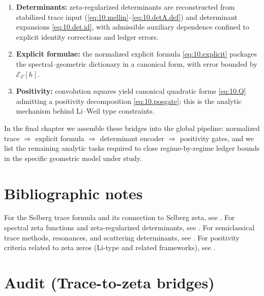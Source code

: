\begin{enumerate}
\item \textbf{Determinants:} zeta-regularized determinants are reconstructed from stabilized trace input
(\eqref{eq:10.mellin}--\eqref{eq:10.detA.def}) and determinant expansions \eqref{eq:10.det.id}, with admissible auxiliary dependence
confined to explicit identity corrections and ledger errors.
\item \textbf{Explicit formulae:} the normalized explicit formula \eqref{eq:10.explicit} packages the spectral--geometric dictionary
in a canonical form, with error bounded by $\mathcal E_\Gamma[h]$.
\item \textbf{Positivity:} convolution squares yield canonical quadratic forms \eqref{eq:10.Q} admitting a positivity decomposition
\eqref{eq:10.posgate}; this is the analytic mechanism behind Li--Weil type constraints.
\end{enumerate}

In the final chapter we assemble these bridges into the global pipeline: normalized trace $\Rightarrow$ explicit formula
$\Rightarrow$ determinant encoder $\Rightarrow$ positivity gates, and we list the remaining analytic tasks required to close
regime-by-regime ledger bounds in the specific geometric model under study.

\section*{Bibliographic notes}

For the Selberg trace formula and its connection to Selberg zeta, see \cite{Hejhal1983,Buser1992}.
For spectral zeta functions and zeta-regularized determinants, see \cite{Seeley1967,RaySinger1971}.
For semiclassical trace methods, resonances, and scattering determinants, see \cite{Zworski2012,DyatlovZworski2019}.
For positivity criteria related to zeta zeros (Li-type and related frameworks), see \cite{Li1997,Connes1999,Titchmarsh1986}.


\section*{Audit (Trace-to-zeta bridges)}\label{sec:10.audit}

